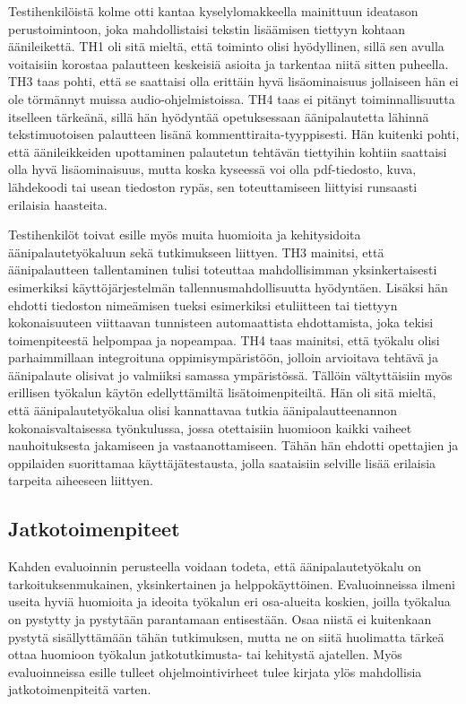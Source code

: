 \documentclass[utf8]{gradu3}
\begin{document}
Testihenkilöistä kolme otti kantaa kyselylomakkeella mainittuun ideatason perustoimintoon, joka mahdollistaisi tekstin lisäämisen tiettyyn kohtaan äänileikettä. TH1 oli sitä mieltä, että toiminto olisi hyödyllinen, sillä sen avulla voitaisiin korostaa palautteen keskeisiä asioita ja tarkentaa niitä sitten puheella. TH3 taas pohti, että se saattaisi olla erittäin hyvä lisäominaisuus jollaiseen hän ei ole törmännyt muissa audio-ohjelmistoissa.  TH4 taas ei pitänyt toiminnallisuutta itselleen tärkeänä, sillä hän hyödyntää opetuksessaan äänipalautetta lähinnä tekstimuotoisen palautteen lisänä kommenttiraita-tyyppisesti. Hän kuitenki pohti, että äänileikkeiden upottaminen palautetun tehtävän tiettyihin kohtiin saattaisi olla hyvä lisäominaisuus, mutta koska kyseessä voi olla pdf-tiedosto, kuva, lähdekoodi tai usean tiedoston rypäs, sen toteuttamiseen liittyisi runsaasti erilaisia haasteita.

Testihenkilöt toivat esille myös muita huomioita ja kehitysidoita äänipalautetyökaluun sekä tutkimukseen liittyen. TH3 mainitsi, että äänipalautteen tallentaminen tulisi toteuttaa mahdollisimman yksinkertaisesti esimerkiksi käyttöjärjestelmän tallennusmahdollisuutta hyödyntäen. Lisäksi hän ehdotti tiedoston nimeämisen tueksi esimerkiksi etuliitteen tai tiettyyn kokonaisuuteen viittaavan tunnisteen automaattista ehdottamista, joka tekisi toimenpiteestä helpompaa ja nopeampaa. TH4 taas mainitsi, että työkalu olisi parhaimmillaan integroituna oppimisympäristöön, jolloin arvioitava tehtävä ja äänipalaute olisivat jo valmiiksi samassa ympäristössä. Tällöin vältyttäisiin myös erillisen työkalun käytön edellyttämiltä lisätoimenpiteiltä. Hän oli sitä mieltä, että äänipalautetyökalua olisi kannattavaa tutkia äänipalautteenannon kokonaisvaltaisessa työnkulussa, jossa otettaisiin huomioon kaikki vaiheet nauhoituksesta jakamiseen ja vastaanottamiseen. Tähän hän ehdotti opettajien ja oppilaiden suorittamaa käyttäjätestausta, jolla saataisiin selville lisää erilaisia tarpeita aiheeseen liittyen.

\subsection{Jatkotoimenpiteet}

Kahden evaluoinnin perusteella voidaan todeta, että äänipalautetyökalu on tarkoituksenmukainen, yksinkertainen ja helppokäyttöinen. Evaluoinneissa ilmeni useita hyviä huomioita ja ideoita työkalun eri osa-alueita koskien, joilla työkalua on pystytty ja pystytään parantamaan entisestään. Osaa niistä ei kuitenkaan pystytä sisällyttämään tähän tutkimuksen, mutta ne on siitä huolimatta tärkeä ottaa huomioon työkalun jatkotutkimusta- tai kehitystä ajatellen. Myös evaluoinneissa esille tulleet ohjelmointivirheet tulee kirjata ylös mahdollisia jatkotoimenpiteitä varten.
\end{document}
